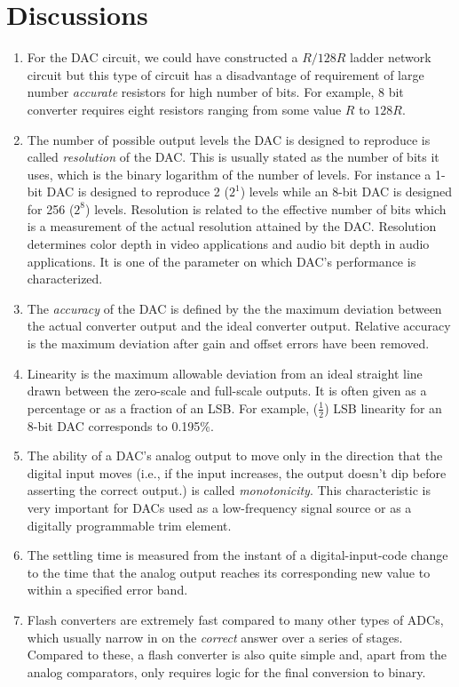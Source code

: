 \documentclass[%
 reprint,
nofootinbib,
 amsmath,amssymb,
 aps,
floatfix,
]{revtex4-2}
\begin{document}
\section{Discussions}
    \begin{enumerate}
        \item For the DAC circuit, we could have constructed a $R/128R$ ladder network circuit but this type of circuit has a disadvantage of requirement of large number \textit{accurate} resistors for high number of bits. For example, 8 bit converter requires eight resistors ranging from some value $R$ to $128R$.
        \item The number of possible output levels the DAC is designed to reproduce is called \textit{resolution} of the DAC. This is usually stated as the number of bits it uses, which is the binary logarithm of the number of levels. For instance a 1-bit DAC is designed to reproduce 2 ($2^1$) levels while an 8-bit DAC is designed for 256 ($2^8$) levels. Resolution is related to the effective number of bits which is a measurement of the actual resolution attained by the DAC. Resolution determines color depth in video applications and audio bit depth in audio applications. It is one of the parameter on which DAC's performance is characterized.
        \item The \textit{accuracy} of the DAC is defined by the the maximum deviation between the actual converter output and the ideal converter output. Relative accuracy is the maximum deviation after gain and offset errors have been removed.
        \item Linearity is the maximum allowable deviation from an ideal straight line drawn between the zero-scale and full-scale outputs. It is often given as a percentage or as a fraction of an LSB. For example, ($\frac{1}{2}$) LSB linearity for an 8-bit DAC corresponds to 0.195\%.
        \item The ability of a DAC's analog output to move only in the direction that the digital input moves (i.e., if the input increases, the output doesn't dip before asserting the correct output.) is called \textit{monotonicity}. This characteristic is very important for DACs used as a low-frequency signal source or as a digitally programmable trim element.
        \item The settling time is measured from the instant of a digital-input-code change to the time that the analog output reaches its corresponding new value to within a specified error band.
        \item Flash converters are extremely fast compared to many other types of ADCs, which usually narrow in on the \textit{correct} answer over a series of stages. Compared to these, a flash converter is also quite simple and, apart from the analog comparators, only requires logic for the final conversion to binary.

\end{enumerate}
\end{document}
